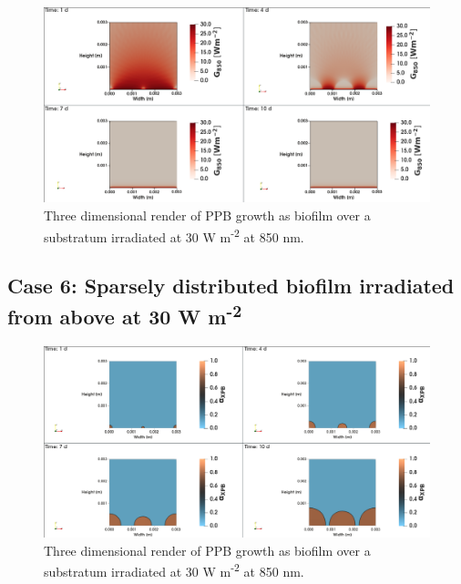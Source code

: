 \begin{figure}[H]
    \centering
    \includegraphics[width=\textwidth,height=0.4\textheight]{Chap4/results/post_processing/2D_cases/case5_rad.png}
    \caption{Three dimensional render of PPB growth as biofilm over a substratum irradiated at 30 W m\textsuperscript{-2} at 850 nm. } 
    \label{fig:case5_3D_rad}
\end{figure}

\subsection{Case 6: Sparsely distributed biofilm irradiated from above at 30 W m\textsuperscript{-2}}
\begin{figure}[H]
    \centering
    \includegraphics[width=\textwidth,height=0.4\textheight]{Chap4/results/post_processing/2D_cases/case6_ppb.png}
    \caption{Three dimensional render of PPB growth as biofilm over a substratum irradiated at 30 W m\textsuperscript{-2} at 850 nm. } 
    \label{fig:case5_3D_rad}
\end{figure}

